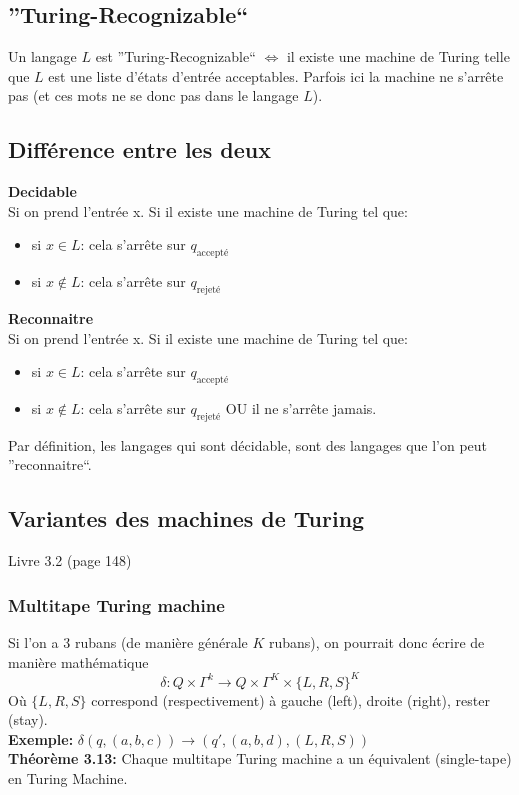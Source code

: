 \documentclass[a4paper,12pt]{article}
\begin{document}
  \subsection{''Turing-Recognizable``}
    Un langage $L$ est ''Turing-Recognizable`` $\Leftrightarrow$ il existe une machine de Turing telle que $L$ est une liste d'états d'entrée acceptables.  Parfois ici la machine ne s'arrête pas (et ces mots ne se donc pas dans le langage $L$).

  \subsection{Différence entre les deux}
    \textbf{Decidable}\\
    Si on prend l'entrée x.  Si il existe une machine de Turing tel que:
    \begin{itemize}
      \item si $x \in L$:  cela s'arrête sur $q_{\text{accepté}}$
      \item si $x \notin L$:  cela s'arrête sur $q_{\text{rejeté}}$
    \end{itemize}

    \textbf{Reconnaitre}\\
    Si on prend l'entrée x.  Si il existe une machine de Turing tel que:
    \begin{itemize}
      \item si $x \in L$:  cela s'arrête sur $q_{\text{accepté}}$
      \item si $x \notin L$:  cela s'arrête sur $q_{\text{rejeté}}$ OU il ne s'arrête jamais.
    \end{itemize}
    Par définition, les langages qui sont décidable, sont des langages que l'on peut ''reconnaitre``.

  \subsection{Variantes des machines de Turing}
    Livre 3.2 (page 148)

    \subsubsection{Multitape Turing machine}
      Si l'on a 3 rubans (de manière générale $K$ rubans), on pourrait donc écrire de manière mathématique
      $$\delta : Q \times \Gamma^{k} \rightarrow Q \times \Gamma^K \times \{L, R, S\}^K$$
      Où $\{L, R, S\}$ correspond (respectivement) à gauche (left), droite (right), rester (stay).\\
      \textbf{Exemple: } $\delta(q, (a, b, c)) \rightarrow (q', (a, b, d), (L, R, S))$\\
      \textbf{Théorème 3.13:} Chaque multitape Turing machine a un équivalent (single-tape) en Turing Machine.
\end{document}
